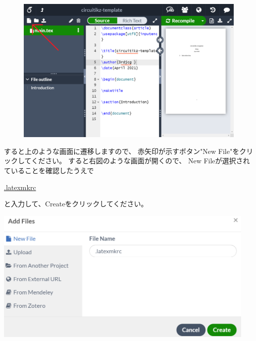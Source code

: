 		\begin{figure}[H]
			\centering
			\includegraphics[width=\textwidth]{overleaf-editer-initial.png}
		\end{figure}
		
		\noindent
		\begin{minipage}{0.4\hsize}%
			すると上のような画面に遷移しますので、
			赤矢印が示すボタン"New File"をクリックしてください。
			すると右図のような画面が開くので、
			New Fileが選択されていることを確認したうえで
			\begin{mdframed}[style=shadow]
				\url{.latexmkrc}
			\end{mdframed}\vspace{-3mm}
			と入力して、Createをクリックしてください。
		\end{minipage}\hfill
		\begin{minipage}{0.6\hsize}
			\begin{flushright}
				\includegraphics[width=0.95\textwidth]{overleaf-editer-newfile.png}
			\end{flushright}
		\end{minipage}
		
